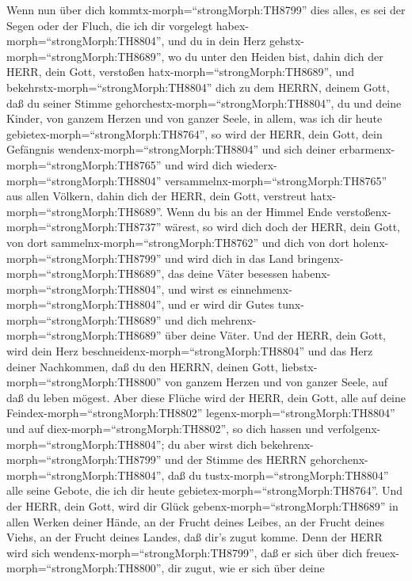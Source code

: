  Wenn nun über dich kommtx-morph=``strongMorph:TH8799'' dies
alles, es sei der Segen oder der Fluch, die ich dir vorgelegt
habex-morph=``strongMorph:TH8804'', und du in dein Herz
gehstx-morph=``strongMorph:TH8689'', wo du unter den Heiden bist, dahin
dich der HERR, dein Gott, verstoßen hatx-morph=``strongMorph:TH8689'',
 und bekehrstx-morph=``strongMorph:TH8804'' dich zu dem
HERRN, deinem Gott, daß du seiner Stimme
gehorchestx-morph=``strongMorph:TH8804'', du und deine Kinder, von
ganzem Herzen und von ganzer Seele, in allem, was ich dir heute
gebietex-morph=``strongMorph:TH8764'',  so wird der HERR,
dein Gott, dein Gefängnis wendenx-morph=``strongMorph:TH8804'' und sich
deiner erbarmenx-morph=``strongMorph:TH8765'' und wird dich
wiederx-morph=``strongMorph:TH8804''
versammelnx-morph=``strongMorph:TH8765'' aus allen Völkern, dahin dich
der HERR, dein Gott, verstreut hatx-morph=``strongMorph:TH8689''.
 Wenn du bis an der Himmel Ende
verstoßenx-morph=``strongMorph:TH8737'' wärest, so wird dich doch der
HERR, dein Gott, von dort sammelnx-morph=``strongMorph:TH8762'' und dich
von dort holenx-morph=``strongMorph:TH8799''  und wird dich
in das Land bringenx-morph=``strongMorph:TH8689'', das deine Väter
besessen habenx-morph=``strongMorph:TH8804'', und wirst es
einnehmenx-morph=``strongMorph:TH8804'', und er wird dir Gutes
tunx-morph=``strongMorph:TH8689'' und dich
mehrenx-morph=``strongMorph:TH8689'' über deine Väter.  Und
der HERR, dein Gott, wird dein Herz
beschneidenx-morph=``strongMorph:TH8804'' und das Herz deiner
Nachkommen, daß du den HERRN, deinen Gott,
liebstx-morph=``strongMorph:TH8800'' von ganzem Herzen und von ganzer
Seele, auf daß du leben mögest.  Aber diese Flüche wird der
HERR, dein Gott, alle auf deine Feindex-morph=``strongMorph:TH8802''
legenx-morph=``strongMorph:TH8804'' und auf
diex-morph=``strongMorph:TH8802'', so dich hassen und
verfolgenx-morph=``strongMorph:TH8804'';  du aber wirst dich
bekehrenx-morph=``strongMorph:TH8799'' und der Stimme des HERRN
gehorchenx-morph=``strongMorph:TH8804'', daß du
tustx-morph=``strongMorph:TH8804'' alle seine Gebote, die ich dir heute
gebietex-morph=``strongMorph:TH8764''.  Und der HERR, dein
Gott, wird dir Glück gebenx-morph=``strongMorph:TH8689'' in allen Werken
deiner Hände, an der Frucht deines Leibes, an der Frucht deines Viehs,
an der Frucht deines Landes, daß dir's zugut komme. Denn der HERR wird
sich wendenx-morph=``strongMorph:TH8799'', daß er sich über dich
freuex-morph=``strongMorph:TH8800'', dir zugut, wie er sich über deine
